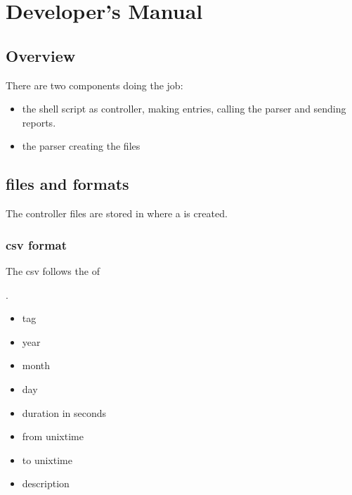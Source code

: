 \documentclass[letterpaper,10pt,english]{sphinxmanual}
\begin{document}
\section{Developer’s Manual}
\label{\detokenize{devmanual:developers-manual}}\label{\detokenize{devmanual::doc}}

\subsection{Overview}
\label{\detokenize{devmanual:overview}}
There are two components doing the job:
\begin{itemize}
\item {} 
the shell script as controller, making entries, calling the parser and sending reports.

\item {} 
the parser creating the  files

\end{itemize}


\subsection{files and formats}
\label{\detokenize{devmanual:files-and-formats}}
The controller files are stored in  where a  is created.


\subsubsection{csv format}
\label{\detokenize{devmanual:csv-format}}
The csv follows the  of  %
\begin{footnote}[1]\sphinxAtStartFootnote
{}
%
\end{footnote}.
\begin{itemize}
\item {} 
tag

\item {} 
year

\item {} 
month

\item {} 
day

\item {} 
duration in seconds

\item {} 
from unixtime

\item {} 
to unixtime

\item {} 
description

\end{itemize}
\end{document}

